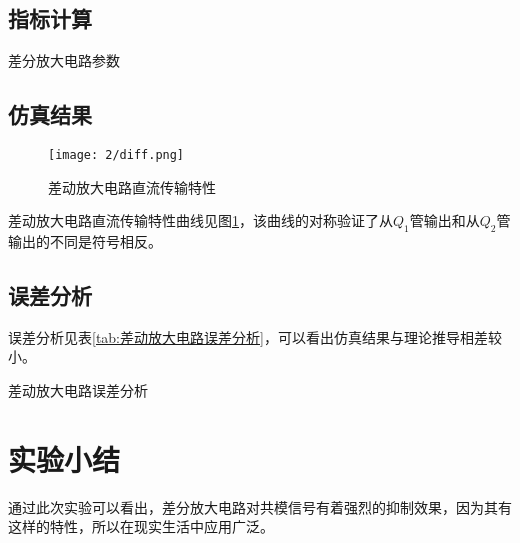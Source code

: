 \subsection{指标计算}%
\label{sub:\arabic{chapter}指标计算}

\begin{table}[H]
	\centering
	\caption{差分放大电路参数}
	\label{tab:差分放大电路参数}
\end{table}

\subsection{仿真结果}%
\label{sub:\arabic{chapter}仿真结果}

\begin{figure}[H]
	\centering
	\texttt{[image: 2/diff.png]}
	\caption{差动放大电路直流传输特性}
	\label{fig:差动放大电路直流传输特性}
\end{figure}

差动放大电路直流传输特性曲线见图\ref{fig:差动放大电路直流传输特性}，该曲线的对称验证了从$ Q_1 $管输出和从$ Q_2 $管输出的不同是符号相反。

\subsection{误差分析}%
\label{sub:\arabic{chapter}误差分析}

误差分析见表\ref{tab:差动放大电路误差分析}，可以看出仿真结果与理论推导相差较小。

\begin{table}[H]
	\centering
	\caption{差动放大电路误差分析}
	\label{tab:差动放大电路误差分析}
\end{table}

\section{实验小结}%
\label{sec:\arabic{chapter}实验小结}

通过此次实验可以看出，差分放大电路对共模信号有着强烈的抑制效果，因为其有这样的特性，所以在现实生活中应用广泛。

